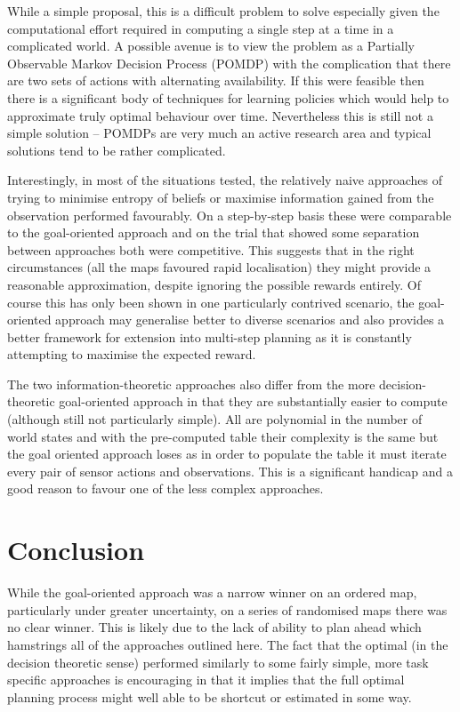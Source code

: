 \documentclass{article}
\begin{document}
While a simple proposal, this is a difficult problem to solve especially given the 
computational effort required in computing a single step at a time in a complicated
world. A possible avenue is to view the problem as a Partially Observable Markov
Decision Process (POMDP) with the complication that there are two sets of actions with
alternating availability. If this were feasible then there is a significant body of 
techniques for learning policies which would help to approximate truly optimal behaviour
over time. Nevertheless this is still not a simple solution -- POMDPs are very much
an active research area and typical solutions tend to be rather complicated.

Interestingly, in most of the situations tested, the relatively naive approaches of 
trying to minimise entropy of beliefs or maximise information gained from the 
observation performed favourably. On a step-by-step basis these were comparable to the
goal-oriented approach and on the trial that showed some separation between approaches 
both were competitive. This suggests that in the right circumstances (all the maps 
favoured rapid localisation) they might provide a reasonable approximation, despite 
ignoring the possible rewards entirely. Of course this has only been shown in one
particularly contrived scenario, the goal-oriented approach may generalise better to
diverse scenarios and also provides a better framework for extension into multi-step
planning as it is constantly attempting to maximise the expected reward.

The two information-theoretic approaches also differ from the more decision-theoretic
goal-oriented approach in that they are substantially easier to compute (although still
not particularly simple). All are 
polynomial in the number of world states and with the pre-computed table their 
complexity is the same but the goal oriented approach loses as in order to populate the
table it must iterate every pair of sensor actions and observations. This is a 
significant handicap and a good reason to favour one of the less complex approaches.

\section{Conclusion}
While the goal-oriented approach was a narrow winner on an ordered map, particularly 
under greater uncertainty, on a series of randomised maps there was no clear winner.
This is likely due to the lack of ability to plan ahead which hamstrings all of the 
approaches outlined here. The fact that the optimal (in the decision theoretic sense)
performed similarly to some fairly simple, more task specific approaches is encouraging
in that it implies that the full optimal planning process might well able to be shortcut
or estimated in some way.

\printbibliography
\end{document}
